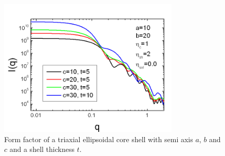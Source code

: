 \begin{figure}[htb]
\begin{center}
\includegraphics[width=0.768\textwidth,height=0.588\textwidth]{../images/form_factor/Ellipsoid/triax_ellipsoidal_core_shell.png}
\end{center}
\caption{Form factor of a triaxial ellipsoidal core shell with semi
axis $a$, $b$ and $c$ and a shell thickness $t$.}
\label{fig:I_triax_ellipsoidal_core_shell}
\end{figure} 